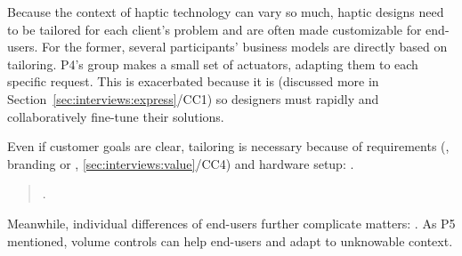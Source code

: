%
%
%
%
Because the context of haptic technology can vary so much, haptic designs need to be tailored for each client's problem and are often made customizable for end-users.
For the former, several participants' business models are directly based on tailoring.
P4's group makes a small set of actuators, adapting them to each specific request. %
This is exacerbated because it is %
 (discussed more in Section~\ref{sec:interviews:express}/CC1) so designers must rapidly and collaboratively fine-tune their solutions.


Even if customer goals are clear, 
tailoring is necessary because of requirements (\eg, branding or , \ref{sec:interviews:value}/CC4) and hardware setup:
.
\begin{quote}
  .
  \end{quote}

\noindent Meanwhile, individual differences of end-users further complicate matters: 
.
As P5 mentioned, volume controls can help end-users and adapt to unknowable context.



